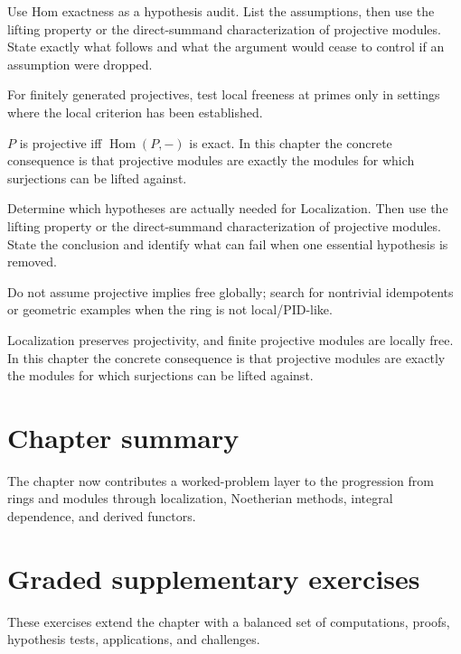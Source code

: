 \begin{exercise}\label{exr:v13-07}
Use Hom exactness as a hypothesis audit. List the assumptions, then use the lifting property or the direct-summand characterization of projective modules. State exactly what follows and what the argument would cease to control if an assumption were dropped.
\end{exercise}
\begin{hint}
For finitely generated projectives, test local freeness at primes only in settings where the local criterion has been established.
\end{hint}
\begin{solution}
$P$ is projective iff $\operatorname{Hom}(P,-)$ is exact. In this chapter the concrete consequence is that projective modules are exactly the modules for which surjections can be lifted against.
\end{solution}

\begin{exercise}\label{exr:v13-08}
Determine which hypotheses are actually needed for Localization. Then use the lifting property or the direct-summand characterization of projective modules. State the conclusion and identify what can fail when one essential hypothesis is removed.
\end{exercise}
\begin{hint}
Do not assume projective implies free globally; search for nontrivial idempotents or geometric examples when the ring is not local/PID-like.
\end{hint}
\begin{solution}
Localization preserves projectivity, and finite projective modules are locally free. In this chapter the concrete consequence is that projective modules are exactly the modules for which surjections can be lifted against.
\end{solution}

\section*{Chapter summary}
The chapter now contributes a worked-problem layer to the progression from rings and modules through localization, Noetherian methods, integral dependence, and derived functors.
\section{Graded supplementary exercises}
These exercises extend the chapter with a balanced set of computations, proofs, hypothesis tests, applications, and challenges.


